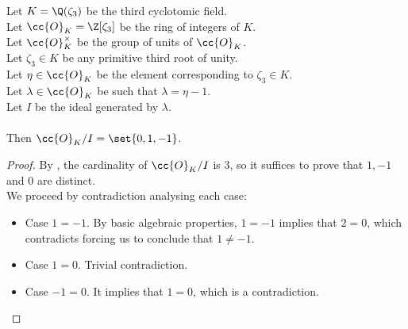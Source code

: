 \begin{lemma}
    \label{lmm:univ_quot}
    \leanok
    Let $K = \Q(\zeta_3)$ be the third cyclotomic field. \\
    Let $\cc{O}_K = \Z[\zeta_3]$ be the ring of integers of $K$. \\
    Let $\cc{O}^\times_K$ be the group of units of $\cc{O}_K$. \\
    Let $\zeta_3 \in K$ be any primitive third root of unity. \\
    Let $\eta \in \cc{O}_K$ be the element corresponding to $\zeta_3 \in K$. \\
    Let $\lambda \in \cc{O}_K$ be such that $\lambda = \eta -1$. \\
    Let $I$ be the ideal generated by $\lambda$. \\\\
    Then $\cc{O}_K / I = \set{0, 1, -1}$.
\end{lemma}
\begin{proof}
    \leanok
    By , the cardinality of $\cc{O}_K / I$ is $3$,
    so it suffices to prove that $1,-1$ and $0$ are distinct.\\
    We proceed by contradiction analysing each case:
    \begin{itemize}
        \item Case $1 = -1$. By basic algebraic properties, $1 = -1$ implies that $2 = 0$,
              which contradicts  forcing us to conclude that $1 \neq -1$.
        \item Case $1 = 0$. Trivial contradiction.
        \item Case $-1 = 0$. It implies that $1 = 0$, which is a contradiction.
    \end{itemize}
\end{proof}

